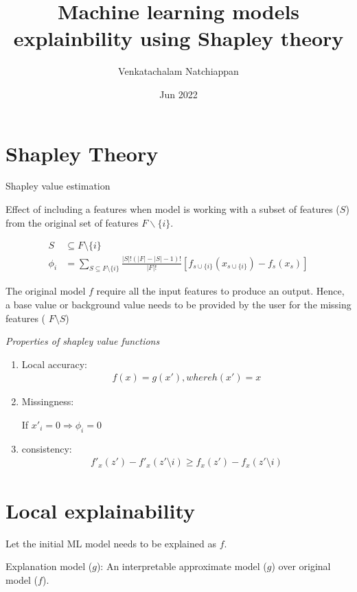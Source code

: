 \documentclass{article}
\title{Machine learning models explainbility using Shapley theory}
\author{Venkatachalam Natchiappan}
\date{Jun 2022}
\begin{document}
\maketitle

\section{Shapley Theory}
Shapley value estimation

Effect of including a features when model is working with a subset of features ($S$) from the original set of features $F \backslash \{i\}$.

\begin{align}
    S &\subseteq F \setminus \{i\} \\
    \phi_i &=  \sum_{S \subseteq F \setminus \{i\}} \frac{|S|! (|F| - |S| - 1)!}  {|F|!} [ f_{s\cup \{i\}}(x_{s\cup \{i\}}) - f_s(x_s)  ]
\end{align}


The original model $f$ require all the input features to produce an output. Hence, a base value or background value needs to be provided by the user for the missing features ( $F \setminus S$)


\textit{Properties of shapley value functions}
\begin{enumerate}
        \item Local accuracy:
            \begin{align}
                f(x) = g(x'), where h(x') = x
            \end{align}

        \item Missingness:

            If $ x'_i = 0 \Rightarrow \phi_i = 0 $

        \item consistency:
            \begin{align}
            f'_x (z') - f'_x(z'\setminus i) \geq f_x(z') - f_x(z' \setminus i)
            \end{align}

\end{enumerate}
\section{Local explainability}

Let the initial ML model needs to be explained as $f$.

Explanation model ($g$): An interpretable approximate model ($g$) over original model ($f$). 
\end{document}
